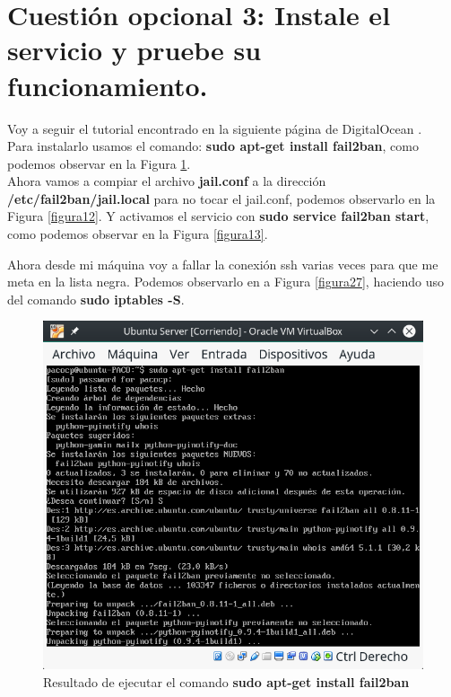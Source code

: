 
\section{Cuestión opcional 3: Instale el servicio y pruebe su funcionamiento.}

Voy a seguir el tutorial encontrado en la siguiente página de DigitalOcean \cite{fail2ban}.\\
Para instalarlo usamos el comando: \textbf{sudo apt-get install fail2ban}, como podemos observar en la Figura \ref{figura11}.\\

Ahora vamos a compiar el archivo \textbf{jail.conf} a la dirección \textbf{/etc/fail2ban/jail.local} para no tocar el jail.conf, podemos observarlo en la Figura \ref{figura12}. Y activamos el servicio con \textbf{sudo service fail2ban start}, como podemos observar en la Figura 
\ref{figura13}.

Ahora desde mi máquina voy a fallar la conexión ssh varias veces para que me meta en la lista negra. Podemos observarlo en a Figura \ref{figura27}, haciendo uso del comando \textbf{sudo iptables -S}.

\begin{figure}[H] %
	\centering
	\includegraphics[scale=0.5]{figuras/figura11.png}  %
	
	
	\caption{Resultado de ejecutar el comando \textbf{sudo apt-get install fail2ban}}
	\label{figura11}
\end{figure}

